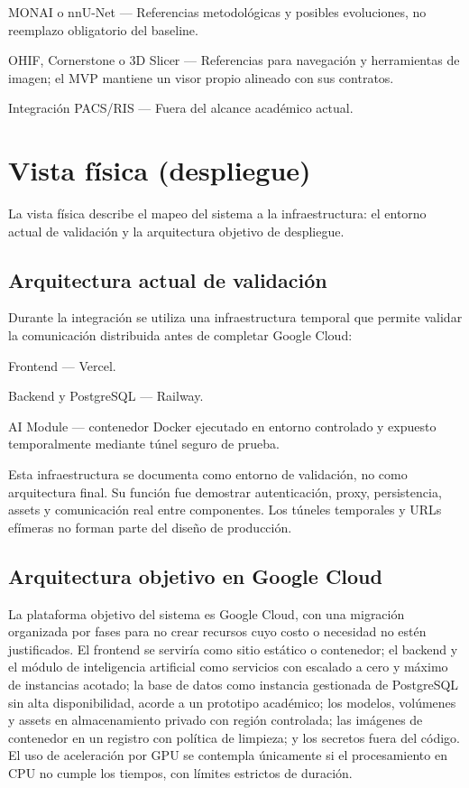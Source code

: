 MONAI o nnU-Net — Referencias metodológicas y posibles evoluciones, no reemplazo obligatorio del baseline.

OHIF, Cornerstone o 3D Slicer — Referencias para navegación y herramientas de imagen; el MVP mantiene un visor propio alineado con sus contratos.

Integración PACS/RIS — Fuera del alcance académico actual.

\section{Vista física (despliegue)}

La vista física describe el mapeo del sistema a la infraestructura: el entorno actual de validación y la arquitectura objetivo de despliegue.

\subsection{Arquitectura actual de validación}

Durante la integración se utiliza una infraestructura temporal que permite validar la comunicación distribuida antes de completar Google Cloud:

Frontend — Vercel.

Backend y PostgreSQL — Railway.

AI Module — contenedor Docker ejecutado en entorno controlado y expuesto temporalmente mediante túnel seguro de prueba.

Esta infraestructura se documenta como entorno de validación, no como arquitectura final. Su función fue demostrar autenticación, proxy, persistencia, assets y comunicación real entre componentes. Los túneles temporales y URLs efímeras no forman parte del diseño de producción.

\subsection{Arquitectura objetivo en Google Cloud}

La plataforma objetivo del sistema es Google Cloud, con una migración organizada por fases para no crear recursos cuyo costo o necesidad no estén justificados. El frontend se serviría como sitio estático o contenedor; el backend y el módulo de inteligencia artificial como servicios con escalado a cero y máximo de instancias acotado; la base de datos como instancia gestionada de PostgreSQL sin alta disponibilidad, acorde a un prototipo académico; los modelos, volúmenes y assets en almacenamiento privado con región controlada; las imágenes de contenedor en un registro con política de limpieza; y los secretos fuera del código. El uso de aceleración por GPU se contempla únicamente si el procesamiento en CPU no cumple los tiempos, con límites estrictos de duración.

